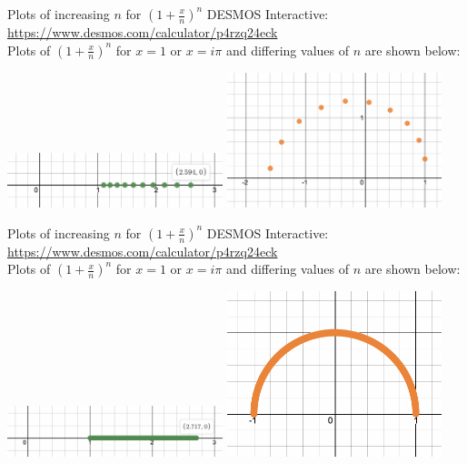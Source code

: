\documentclass{beamer}
\begin{document}
\begin{frame}
  \begin{block}{Plots of increasing $n$ for $(1 + \frac{x}{n})^n$}
  DESMOS Interactive: \url{https://www.desmos.com/calculator/p4rzq24eck}\\
  Plots of $(1+\frac{x}{n})^n$ for $x = 1$ or $x=i\pi$ and differing values of $n$ are shown below:
  \end{block}
  \begin{minipage}{\textwidth}
    \includegraphics[width=0.47\textwidth]{real_exp_10.png}
    \includegraphics[width=0.47\textwidth]{complex_exp_10.png}
  \end{minipage}
\end{frame}

\begin{frame}
  \begin{block}{Plots of increasing $n$ for $(1 + \frac{x}{n})^n$}
  DESMOS Interactive: \url{https://www.desmos.com/calculator/p4rzq24eck}\\
  Plots of $(1+\frac{x}{n})^n$ for $x = 1$ or $x=i\pi$ and differing values of $n$ are shown below:
  \end{block}
  \begin{minipage}{\textwidth}
    \includegraphics[width=0.47\textwidth]{real_exp_1000.png}
    \includegraphics[width=0.47\textwidth]{complex_exp_1000.png}
  \end{minipage}
\end{frame}
\end{document}
